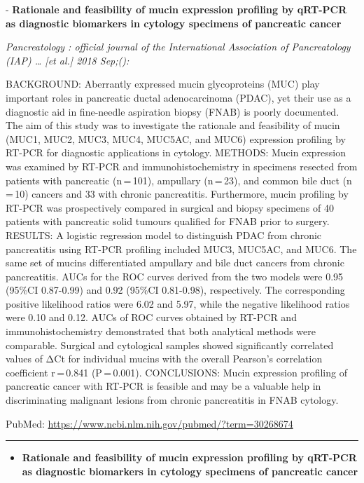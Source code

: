 \documentclass[]{article}
\providecommand{\tightlist}{%
  \setlength{\itemsep}{0pt}\setlength{\parskip}{0pt}}
\begin{document}
 - \textbf{Rationale and feasibility of mucin expression profiling by
qRT-PCR as diagnostic biomarkers in cytology specimens of pancreatic
cancer}

\emph{Pancreatology : official journal of the International Association
of Pancreatology (IAP) \ldots{} {[}et al.{]} 2018 Sep;():}

BACKGROUND: Aberrantly expressed mucin glycoproteins (MUC) play
important roles in pancreatic ductal adenocarcinoma (PDAC), yet their
use as a diagnostic aid in fine-needle aspiration biopsy (FNAB) is
poorly documented. The aim of this study was to investigate the
rationale and feasibility of mucin (MUC1, MUC2, MUC3, MUC4, MUC5AC, and
MUC6) expression profiling by RT-PCR for diagnostic applications in
cytology. METHODS: Mucin expression was examined by RT-PCR and
immunohistochemistry in specimens resected from patients with pancreatic
(n\,=\,101), ampullary (n\,=\,23), and common bile duct (n\,=\,10)
cancers and 33 with chronic pancreatitis. Furthermore, mucin profiling
by RT-PCR was prospectively compared in surgical and biopsy specimens of
40 patients with pancreatic solid tumours qualified for FNAB prior to
surgery. RESULTS: A logistic regression model to distinguish PDAC from
chronic pancreatitis using RT-PCR profiling included MUC3, MUC5AC, and
MUC6. The same set of mucins differentiated ampullary and bile duct
cancers from chronic pancreatitis. AUCs for the ROC curves derived from
the two models were 0.95 (95\%CI 0.87-0.99) and 0.92 (95\%CI 0.81-0.98),
respectively. The corresponding positive likelihood ratios were 6.02 and
5.97, while the negative likelihood ratios were 0.10 and 0.12. AUCs of
ROC curves obtained by RT-PCR and immunohistochemistry demonstrated that
both analytical methods were comparable. Surgical and cytological
samples showed significantly correlated values of ΔCt for individual
mucins with the overall Pearson's correlation coefficient r\,=\,0.841
(P\,=\,0.001). CONCLUSIONS: Mucin expression profiling of pancreatic
cancer with RT-PCR is feasible and may be a valuable help in
discriminating malignant lesions from chronic pancreatitis in FNAB
cytology.

PubMed: \url{https://www.ncbi.nlm.nih.gov/pubmed/?term=30268674}

{}

{}

\begin{center}\rule{0.5\linewidth}{\linethickness}\end{center}

\begin{itemize}
\tightlist
\item
  \textbf{Rationale and feasibility of mucin expression profiling by
  qRT-PCR as diagnostic biomarkers in cytology specimens of pancreatic
  cancer}
\end{itemize}
\end{document}
